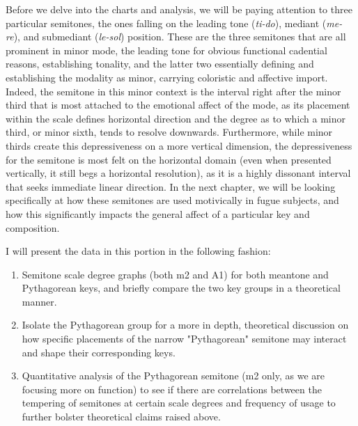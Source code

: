 Before we delve into the charts and analysis, we will be paying
attention to three particular semitones, the ones falling on the leading
tone (\emph{ti-do}), mediant (\emph{me-re}), and submediant
(\emph{le-sol}) position. These are the three semitones that are all
prominent in minor mode, the leading tone for obvious functional
cadential reasons, establishing tonality, and the latter two essentially
defining and establishing the modality as minor, carrying coloristic and
affective import. Indeed, the semitone in this minor context is the
interval right after the minor third that is most attached to the
emotional affect of the mode, as its placement within the scale defines
horizontal direction and the degree as to which a minor third, or minor
sixth, tends to resolve downwards. Furthermore, while minor thirds
create this depressiveness on a more vertical dimension, the
depressiveness for the semitone is most felt on the horizontal domain
(even when presented vertically, it still begs a horizontal resolution),
as it is a highly dissonant interval that seeks immediate linear
direction. In the next chapter, we will be looking specifically at how
these semitones are used motivically in fugue subjects, and how this
significantly impacts the general affect of a particular key and
composition.

I will present the data in this portion in the following fashion:

\begin{enumerate}
\def\labelenumi{\arabic{enumi}.}
\tightlist
\item
  Semitone scale degree graphs (both m2 and A1) for both meantone and
  Pythagorean keys, and briefly compare the two key groups in a
  theoretical manner.
\item
  Isolate the Pythagorean group for a more in depth, theoretical
  discussion on how specific placements of the narrow "Pythagorean"
  semitone may interact and shape their corresponding keys.
\item
  Quantitative analysis of the Pythagorean semitone (m2 only, as we are
  focusing more on function) to see if there are correlations between
  the tempering of semitones at certain scale degrees and frequency of
  usage to further bolster theoretical claims raised above.
\end{enumerate}


    \begin{center}
    \end{center}
    

